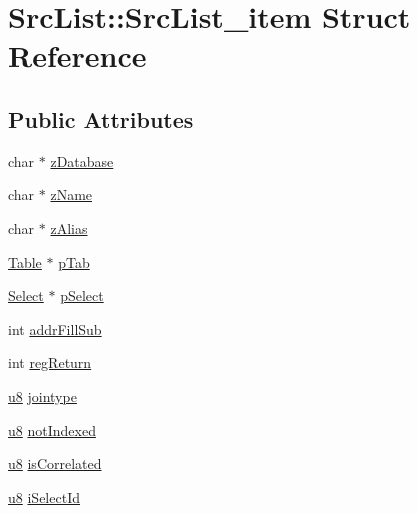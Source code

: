 \hypertarget{struct_src_list_1_1_src_list__item}{\section{Src\-List\-:\-:Src\-List\-\_\-item Struct Reference}
\label{struct_src_list_1_1_src_list__item}
}
\subsection*{Public Attributes}
\begin{DoxyCompactItemize}
\item 
char $\ast$ \hyperlink{struct_src_list_1_1_src_list__item_a2f7bf0921794dc46d74d2546fc10f7de}{z\-Database}
\item 
char $\ast$ \hyperlink{struct_src_list_1_1_src_list__item_afee5c5a84594fed8100be3cdb3e3ff1c}{z\-Name}
\item 
char $\ast$ \hyperlink{struct_src_list_1_1_src_list__item_a461ef8d80828ed8dd4409b9244ae2919}{z\-Alias}
\item 
\hyperlink{struct_table}{Table} $\ast$ \hyperlink{struct_src_list_1_1_src_list__item_a8779b2d10d0e25af78ad90e57f9cd4f6}{p\-Tab}
\item 
\hyperlink{struct_select}{Select} $\ast$ \hyperlink{struct_src_list_1_1_src_list__item_ab44822fca7618c4f41f4f770ad41425b}{p\-Select}
\item 
int \hyperlink{struct_src_list_1_1_src_list__item_a1fb4f55d13641e11f07c3e535fd7cf1d}{addr\-Fill\-Sub}
\item 
int \hyperlink{struct_src_list_1_1_src_list__item_a67344976677cbbdea271fcdf7be620cc}{reg\-Return}
\item 
\hyperlink{sqlite3_8c_a74a0f6424ae628af25f23f0a35f6ead3}{u8} \hyperlink{struct_src_list_1_1_src_list__item_a36193fe4914ddc86222e5c70d9639a00}{jointype}
\item 
\hyperlink{sqlite3_8c_a74a0f6424ae628af25f23f0a35f6ead3}{u8} \hyperlink{struct_src_list_1_1_src_list__item_a4465537a30765604006ec58f0fcc3a56}{not\-Indexed}
\item 
\hyperlink{sqlite3_8c_a74a0f6424ae628af25f23f0a35f6ead3}{u8} \hyperlink{struct_src_list_1_1_src_list__item_add716d86abd97e27b4a2da16f4918f9e}{is\-Correlated}
\item 
\hyperlink{sqlite3_8c_a74a0f6424ae628af25f23f0a35f6ead3}{u8} \hyperlink{struct_src_list_1_1_src_list__item_a099cfe9b7559b42c49dda02e57188738}{i\-Select\-Id}
\item 

\end{DoxyCompactItemize}
